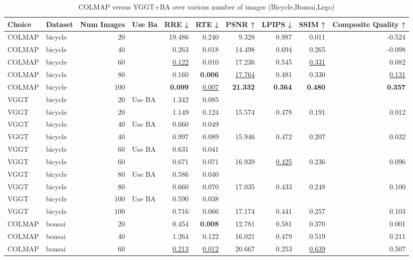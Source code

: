 \begin{table}[H]
\caption{COLMAP versus VGGT+BA over various number of images (Bicycle,Bonsai,Lego)}
\label{tab:01_num_images_use_ba_bicycle,bonsai,lego}
\small
\begin{tabular}{llrlrrrrrr}
\toprule
Choice & Dataset & Num Images & Use Ba & RRE ↓ & RTE ↓ & PSNR ↑ & LPIPS ↓ & SSIM ↑ & Composite Quality ↑ \\
\midrule
COLMAP & bicycle & 20 &  & 19.486 & 0.240 & 9.328 & 0.987 & 0.011 & -0.524 \\
COLMAP & bicycle & 40 &  & 0.263 & 0.018 & 14.498 & 0.694 & 0.265 & -0.098 \\
COLMAP & bicycle & 60 &  & \underline{0.122} & 0.010 & 17.236 & 0.545 & \underline{0.331} & 0.082 \\
COLMAP & bicycle & 80 &  & 0.160 & \textbf{0.006} & \underline{17.764} & 0.481 & 0.330 & \underline{0.131} \\
COLMAP & bicycle & 100 &  & \textbf{0.099} & \underline{0.007} & \textbf{21.332} & \textbf{0.364} & \textbf{0.480} & \textbf{0.357} \\
VGGT & bicycle & 20 & Use BA & 1.342 & 0.085 &  &  &  &  \\
VGGT & bicycle & 20 &  & 1.149 & 0.124 & 15.574 & 0.478 & 0.191 & 0.012 \\
VGGT & bicycle & 40 & Use BA & 0.660 & 0.049 &  &  &  &  \\
VGGT & bicycle & 40 &  & 0.997 & 0.089 & 15.946 & 0.472 & 0.207 & 0.032 \\
VGGT & bicycle & 60 & Use BA & 0.631 & 0.041 &  &  &  &  \\
VGGT & bicycle & 60 &  & 0.671 & 0.071 & 16.939 & \underline{0.425} & 0.236 & 0.096 \\
VGGT & bicycle & 80 & Use BA & 0.586 & 0.040 &  &  &  &  \\
VGGT & bicycle & 80 &  & 0.660 & 0.070 & 17.035 & 0.433 & 0.248 & 0.100 \\
VGGT & bicycle & 100 & Use BA & 0.590 & 0.038 &  &  &  &  \\
VGGT & bicycle & 100 &  & 0.716 & 0.066 & 17.174 & 0.441 & 0.257 & 0.103 \\
\midrule
COLMAP & bonsai & 20 &  & 0.454 & \textbf{0.008} & 12.781 & 0.581 & 0.370 & 0.001 \\
COLMAP & bonsai & 40 &  & 1.264 & 0.122 & 16.021 & 0.479 & 0.519 & 0.211 \\
COLMAP & bonsai & 60 &  & \underline{0.213} & \underline{0.012} & 20.667 & 0.253 & \underline{0.639} & 0.507 \\

\end{tabular}
\end{table}
